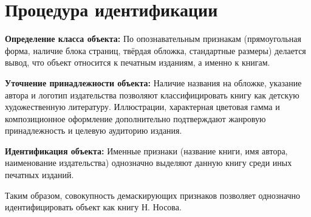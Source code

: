 \documentclass{bsuir}
\begin{document}
\section{Процедура идентификации}

\textbf{Определение класса объекта:}
По опознавательным признакам (прямоугольная форма, наличие блока страниц,
твёрдая обложка, стандартные размеры) делается вывод, что объект относится к
печатным изданиям, а именно к книгам.

\textbf{Уточнение принадлежности объекта:}
Наличие названия  на обложке, указание автора
 и логотип издательства 
позволяют классифицировать книгу как детскую художественную литературу.
Иллюстрации, характерная цветовая гамма и композиционное оформление
дополнительно подтверждают жанровую принадлежность и целевую аудиторию издания.

\textbf{Идентификация объекта:}
Именные признаки (название книги, имя автора, наименование издательства)
однозначно выделяют данную книгу среди иных печатных изданий.

Таким образом, совокупность демаскирующих признаков позволяет однозначно
идентифицировать объект как книгу  Н. Носова.
\end{document}
